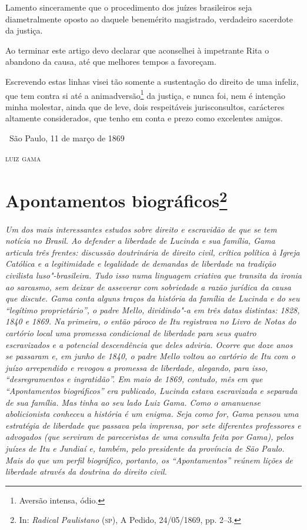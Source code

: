 Lamento sinceramente que o procedimento dos juízes brasileiros seja
diametralmente oposto ao daquele benemérito magistrado, verdadeiro
sacerdote da justiça.

Ao terminar este artigo devo declarar que aconselhei à impetrante Rita o
abandono da causa, até que melhores tempos a favoreçam.

Escrevendo estas linhas visei tão somente a sustentação do direito de
uma infeliz, que tem contra si até a animadversão\footnote{Aversão
  intensa, ódio.} da
justiça, e nunca foi, nem é intenção minha molestar, ainda que de leve,
dois respeitáveis jurisconsultos, carácteres altamente considerados, que
tenho em conta e prezo como excelentes amigos.

\bigskip

\hfill\ São Paulo, 11 de março de 1869\smallskip

\hfill\textsc{luiz gama}



\chapter{Apontamentos biográficos\footnote[*]{In: \emph{Radical
  Paulistano} (\textsc{sp}), A Pedido, 24/05/1869, pp. 2--3.}}

\begin{flushleft}
{\footnotesize\itshape
Um dos mais interessantes estudos sobre direito
e escravidão de que se tem notícia no Brasil. Ao defender a
liberdade de Lucinda e sua família, Gama articula três frentes:
discussão doutrinária de direito civil, crítica política à Igreja
Católica e a legitimidade e legalidade de demandas de liberdade na
tradição civilista luso"-brasileira. Tudo isso numa
linguagem criativa que transita da ironia ao sarcasmo, sem deixar de
asseverar com sobriedade a razão jurídica da causa que discute. Gama
conta alguns traços da história da família de Lucinda e do seu ``legítimo
proprietário'', o padre Mello, dividindo"-a em três datas distintas:
1828, 1840 e 1869. Na primeira,
o então pároco de Itu registrava no Livro de Notas
do cartório local uma promessa condicional de liberdade para seus quatro
escravizados e a potencial descendência que deles adviria.
Ocorre que doze anos se passaram e, em junho de 1840, o padre Mello voltou ao
cartório de Itu com o juízo arrependido e revogou a promessa de
liberdade, alegando, para isso, ``desregramentos e ingratidão''. Em maio
de 1869, contudo, mês em que ``Apontamentos biográficos'' era publicado,
Lucinda estava escravizada e separada de sua família. Mas tinha ao seu
lado Luiz Gama. Como o amanuense abolicionista conheceu a história é um
enigma. Seja como for, Gama pensou uma estratégia de liberdade que
passava pela imprensa, por sete diferentes professores e advogados (que
serviram de pareceristas de uma consulta feita por Gama), pelos juízes
de Itu e Jundiaí e, também, pelo presidente da província de São Paulo.
Mais do que um perfil biográfico, portanto, os ``Apontamentos'' reúnem
lições de liberdade através da doutrina do direito civil. }
\end{flushleft}

